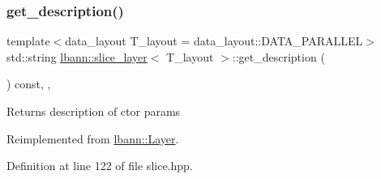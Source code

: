 \subsubsection{\texorpdfstring{get\+\_\+description()}{get\_description()}}
{\footnotesize\ttfamily template$<$data\+\_\+layout T\+\_\+layout = data\+\_\+layout\+::\+D\+A\+T\+A\+\_\+\+P\+A\+R\+A\+L\+L\+EL$>$ \\
std\+::string \hyperlink{classlbann_1_1slice__layer}{lbann\+::slice\+\_\+layer}$<$ T\+\_\+layout $>$\+::get\+\_\+description (\begin{DoxyParamCaption}{ }\end{DoxyParamCaption}) const\hspace{0.3cm}{\ttfamily [inline]}, {\ttfamily [override]}, {\ttfamily [virtual]}}

Returns description of ctor params 

Reimplemented from \hyperlink{classlbann_1_1Layer_acc0803d3428914ca1eb5988c4309174a}{lbann\+::\+Layer}.



Definition at line 122 of file slice.\+hpp.


